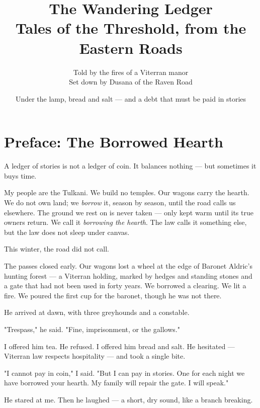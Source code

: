 \documentclass[10pt,twoside]{book}
\begin{document}
\title{\Huge\textbf{The Wandering Ledger}\\ \large Tales of the Threshold, from the Eastern Roads}
\author{Told by the fires of a Viterran manor\\ \small Set down by Dusana of the Raven Road}
\date{Under the lamp, bread and salt --- and a debt that must be paid in stories}
\maketitle

\tableofcontents

\chapter*{Preface: The Borrowed Hearth}

A ledger of stories is not a ledger of coin. It balances nothing --- but sometimes it buys time.

My people are the Tulkani. We build no temples. Our wagons carry the hearth. We do not own land; we \textit{borrow} it, season by season, until the road calls us elsewhere. The ground we rest on is never taken --- only kept warm until its true owners return. We call it \textit{borrowing the hearth}. The law calls it something else, but the law does not sleep under canvas.

This winter, the road did not call.

The passes closed early. Our wagons lost a wheel at the edge of Baronet Aldric's hunting forest --- a Viterran holding, marked by hedges and standing stones and a gate that had not been used in forty years. We borrowed a clearing. We lit a fire. We poured the first cup for the baronet, though he was not there.

He arrived at dawn, with three greyhounds and a constable.

"Trespass," he said. "Fine, imprisonment, or the gallows."

I offered him tea. He refused. I offered him bread and salt. He hesitated --- Viterran law respects hospitality --- and took a single bite.

"I cannot pay in coin," I said. "But I can pay in stories. One for each night we have borrowed your hearth. My family will repair the gate. I will speak."

He stared at me. Then he laughed --- a short, dry sound, like a branch breaking.
\end{document}
